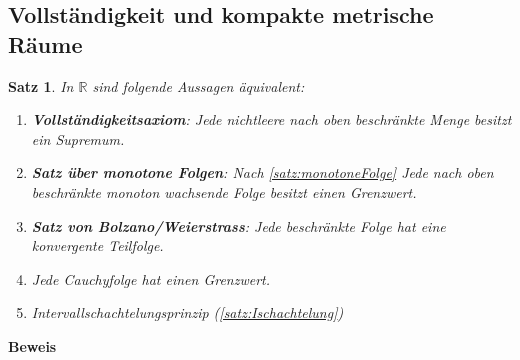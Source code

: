 \documentclass[ngerman,titlepage,twoside, parskip=half*]{scrreprt}
\newcommand*{\R}{\mathbb{R}}
\theoremstyle{plain}
\newtheorem{theorem}{Satz}[section]
\theoremstyle{definition}
\theoremstyle{remark}
\begin{document}
\subsection{Vollständigkeit und kompakte metrische Räume}

\begin{theorem}
In $\R$ sind folgende Aussagen äquivalent:
\begin{enumerate}[(1)]
  \item \textbf{Vollständigkeitsaxiom}: Jede nichtleere nach oben beschränkte Menge besitzt
    ein Supremum.
  \item \textbf{Satz über monotone Folgen}: Nach \autoref{satz:monotoneFolge} Jede 
    nach oben beschränkte mo\-no\-ton wachsende Folge besitzt einen Grenzwert.
  \item \textbf{Satz von Bolzano/Weierstrass}: Jede beschränkte Folge hat eine 
    konvergente Teil\-fol\-ge.
  \item Jede Cauchyfolge hat einen Grenzwert.
  \item Intervallschachtelungsprinzip (\autoref{satz:Ischachtelung})
\end{enumerate}
\end{theorem}
\textbf{Beweis}
\end{document}
